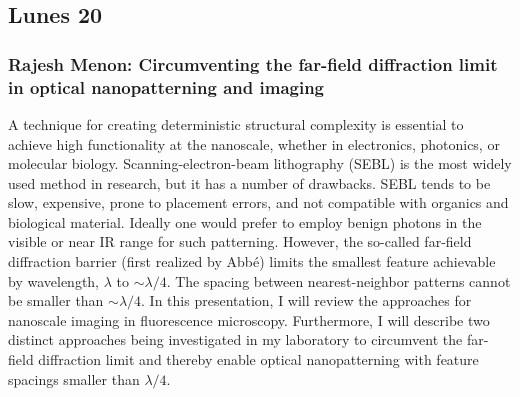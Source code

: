 
\subsection*{Lunes 20}

    \subsubsection*{Rajesh Menon: Circumventing the far-field diffraction limit
in optical nanopatterning and imaging}

A technique for creating deterministic structural complexity is essential to
achieve high functionality at the
nanoscale, whether in electronics, photonics, or molecular biology.
Scanning-electron-beam lithography (SEBL) is
the most widely used method in research, but it has a number of drawbacks. SEBL
tends to be slow, expensive,
prone to placement errors, and not compatible with organics and biological
material. Ideally one would prefer to
employ benign photons in the visible or near IR range for such patterning.
However, the so-called far-field
diffraction barrier (first realized by Abbé) limits the smallest feature
achievable by wavelength, $\lambda$ to $\sim \lambda / 4$. The
spacing between nearest-neighbor patterns cannot be smaller than $\sim \lambda /
4$.
In this presentation, I will review the approaches for nanoscale imaging in
fluorescence microscopy.
Furthermore, I will describe two distinct approaches being investigated in my
laboratory to circumvent the far-field
diffraction limit and thereby enable optical nanopatterning with feature
spacings smaller than $\lambda / 4$.

